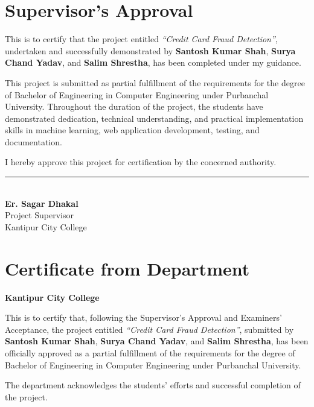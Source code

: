 \documentclass[12pt,a4paper]{report}
\newcommand{\projecttitle}{Credit Card Fraud Detection}
\newcommand{\supervisor}{Er. Sagar Dhakal}
\newcommand{\college}{Kantipur City College}
\begin{document}
\newpage

\chapter*{Supervisor's Approval}

This is to certify that the project entitled \textit{``\projecttitle''}, undertaken and successfully demonstrated by \textbf{Santosh Kumar Shah}, \textbf{Surya Chand Yadav}, and \textbf{Salim Shrestha}, has been completed under my guidance.

This project is submitted as partial fulfillment of the requirements for the degree of Bachelor of Engineering in Computer Engineering under Purbanchal University. Throughout the duration of the project, the students have demonstrated dedication, technical understanding, and practical implementation skills in machine learning, web application development, testing, and documentation.

I hereby approve this project for certification by the concerned authority.

\vspace{2cm}
\noindent\rule{5cm}{0.4pt}\\[0.2cm]
\textbf{\supervisor}\\
Project Supervisor\\
\college

\newpage

\chapter*{Certificate from Department}

\begin{center}
\textbf{\college}
\end{center}

This is to certify that, following the Supervisor's Approval and Examiners' Acceptance, the project entitled \textit{``\projecttitle''}, submitted by \textbf{Santosh Kumar Shah}, \textbf{Surya Chand Yadav}, and \textbf{Salim Shrestha}, has been officially approved as a partial fulfillment of the requirements for the degree of Bachelor of Engineering in Computer Engineering under Purbanchal University.

The department acknowledges the students' efforts and successful completion of the project.
\end{document}
